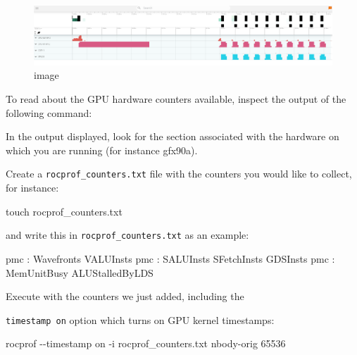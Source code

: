 \documentclass[
]{article}
\let\oldtexttt\texttt
\renewcommand{\texttt}[1]{
  \colorbox{Light}{\oldtexttt{#1}}
}
\newenvironment{Shaded}{}{}
\newcommand{\ExtensionTok}[1]{#1}
\newcommand{\FunctionTok}[1]{\textcolor[rgb]{0.02,0.16,0.49}{#1}}
\newcommand{\NormalTok}[1]{#1}
\newcommand{\VariableTok}[1]{\textcolor[rgb]{0.10,0.09,0.49}{#1}}
\begin{document}
\begin{figure}
\centering
\includegraphics{rocprof/4548abe6eeb76b1896e88fbd38299521eef0d2cd.png}
\caption{image}
\end{figure}

To read about the GPU hardware counters available, inspect the output of
the following command:

\begin{Shaded}
\end{Shaded}

In the output displayed, look for the section associated with the
hardware on which you are running (for instance gfx90a).

Create a \texttt{rocprof\_counters.txt} file with the counters you would
like to collect, for instance:

\begin{Shaded}
\begin{Highlighting}[]
\FunctionTok{touch}\NormalTok{ rocprof\_counters.txt}
\end{Highlighting}
\end{Shaded}

and write this in \texttt{rocprof\_counters.txt} as an example:

\begin{Shaded}
\begin{Highlighting}[]
\ExtensionTok{pmc}\NormalTok{ : Wavefronts VALUInsts}
\ExtensionTok{pmc}\NormalTok{ : SALUInsts SFetchInsts GDSInsts}
\ExtensionTok{pmc}\NormalTok{ : MemUnitBusy ALUStalledByLDS}
\end{Highlighting}
\end{Shaded}

Execute with the counters we just added, including the
\texttt{timestamp\ on} option which turns on GPU kernel timestamps:

\begin{Shaded}
\begin{Highlighting}[]
\ExtensionTok{rocprof}\NormalTok{ {-}{-}timestamp on {-}i rocprof\_counters.txt  nbody{-}orig 65536}
\end{Highlighting}
\end{Shaded}
\end{document}
